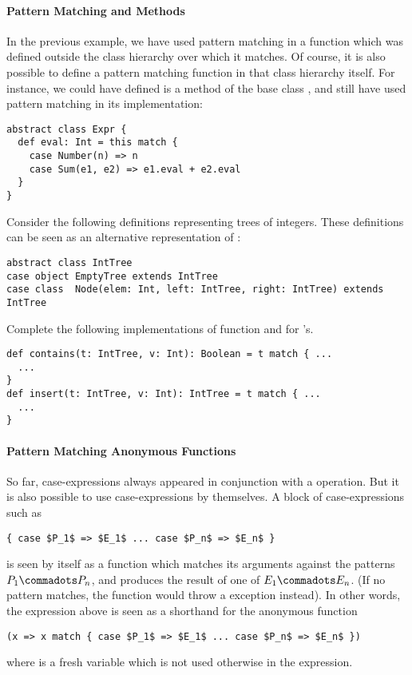\paragraph{Pattern Matching and Methods}
In the previous example, we have used pattern
matching in a function which was defined outside the class hierarchy
over which it matches.  Of course, it is also possible to define a
pattern matching function in that class hierarchy itself. For
instance, we could have defined
 is a method of the base class , and still have used pattern matching in its implementation:
\begin{lstlisting}
abstract class Expr { 
  def eval: Int = this match {
    case Number(n) => n
    case Sum(e1, e2) => e1.eval + e2.eval 
  } 
}
\end{lstlisting}


\begin{exercise} Consider the following definitions representing trees
of integers.  These definitions can be seen as an alternative
representation of :
\begin{lstlisting}
abstract class IntTree
case object EmptyTree extends IntTree
case class  Node(elem: Int, left: IntTree, right: IntTree) extends IntTree
\end{lstlisting}
Complete the following implementations of function  and  for 
's.
\begin{lstlisting}
def contains(t: IntTree, v: Int): Boolean = t match { ...
  ...
}
def insert(t: IntTree, v: Int): IntTree = t match { ...
  ...
}
\end{lstlisting}
\end{exercise}

\paragraph{Pattern Matching Anonymous Functions}

So far, case-expressions always appeared in conjunction with a
\verb@match@ operation. But it is also possible to use
case-expressions by themselves. A block of case-expressions such as
\begin{lstlisting}
{ case $P_1$ => $E_1$ ... case $P_n$ => $E_n$ }
\end{lstlisting}
is seen by itself as a function which matches its arguments
against the patterns $P_1 \commadots P_n$, and produces the result of
one of $E_1 \commadots E_n$. (If no pattern matches, the function
would throw a  exception instead).
In other words, the expression above is seen as a shorthand for the anonymous function
\begin{lstlisting}
(x => x match { case $P_1$ => $E_1$ ... case $P_n$ => $E_n$ })
\end{lstlisting}
where  is a fresh variable which is not used 
otherwise in the expression.

